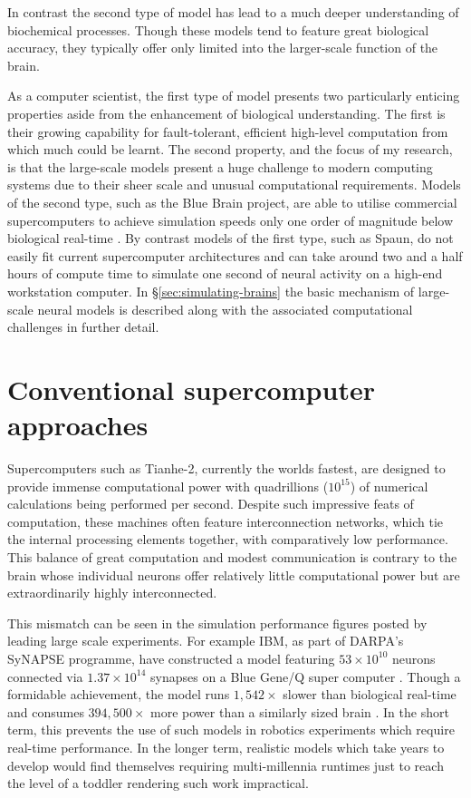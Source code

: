 		In contrast the second type of model has lead to a much deeper understanding
		of biochemical processes. Though these models tend to feature great
		biological accuracy, they typically offer only limited into the larger-scale
		function of the brain.
		
		As a computer scientist, the first type of model presents two particularly
		enticing properties aside from the enhancement of biological understanding.
		The first is their growing capability for fault-tolerant, efficient
		high-level computation from which much could be learnt. The second property,
		and the focus of my research, is that the large-scale models present a huge
		challenge to modern computing systems due to their sheer scale and unusual
		computational requirements. Models of the second type, such as the Blue
		Brain project, are able to utilise commercial supercomputers to achieve
		simulation speeds only one order of magnitude below biological real-time
		\cite{markram06}. By contrast models of the first type, such as Spaun, do
		not easily fit current supercomputer architectures and can take around two
		and a half hours of compute time to simulate one second of neural activity
		on a high-end workstation computer. In \S\ref{sec:simulating-brains} the
		basic mechanism of large-scale neural models is described along with the
		associated computational challenges in further detail.
	
	\section{Conventional supercomputer approaches}
	
		Supercomputers such as Tianhe-2, currently the worlds
		fastest\cite{meuer13n}, are designed to provide immense computational power
		with quadrillions ($10^{15}$) of numerical calculations being performed per
		second. Despite such impressive feats of computation, these machines often
		feature interconnection networks, which tie the internal processing elements
		together, with comparatively low performance. This balance of great
		computation and modest communication is contrary to the brain whose
		individual neurons offer relatively little computational power but are
		extraordinarily highly interconnected.
		
		This mismatch can be seen in the simulation performance figures posted by
		leading large scale experiments. For example IBM, as part of DARPA's SyNAPSE
		programme, have constructed a model featuring $53 \times 10^{10}$ neurons
		connected via $1.37 \times 10^{14}$ synapses on a Blue Gene/Q super computer
		\cite{ibm13}. Though a formidable achievement, the model runs $1,542\times$
		slower than biological real-time and consumes $394,500\times$ more power
		than a similarly sized brain \cite{drubach00}. In the short term, this
		prevents the use of such models in robotics experiments which require
		real-time performance. In the longer term, realistic models which take years
		to develop would find themselves requiring multi-millennia runtimes just to
		reach the level of a toddler rendering such work impractical.
		
